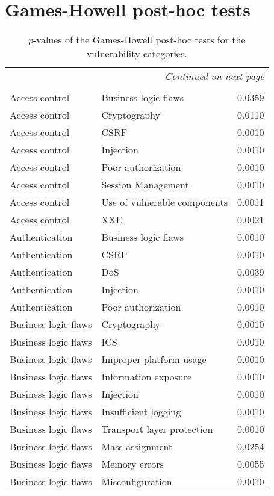 \chapter{Games-Howell post-hoc tests}
\label{app:pairups}

{\footnotesize
\begin{longtable}{lll}
\caption[Games-Howell tests for categories]{$p$-values of the Games-Howell post-hoc tests for the vulnerability categories.}\\
\endfirsthead
\multicolumn{3}{r}{\textit{Continued on next page}} \\
\endfoot
\\
\endlastfoot
Access control & Business logic flaws & 0.0359\\
Access control & Cryptography & 0.0110\\
Access control & CSRF & 0.0010\\
Access control & Injection & 0.0010\\
Access control & Poor authorization & 0.0010\\
Access control & Session Management & 0.0010\\
Access control & Use of vulnerable components & 0.0011\\
Access control & XXE & 0.0021\\
Authentication & Business logic flaws & 0.0010\\
Authentication & CSRF & 0.0010\\
Authentication & DoS & 0.0039\\
Authentication & Injection & 0.0010\\
Authentication & Poor authorization & 0.0010\\
Business logic flaws & Cryptography & 0.0010\\
Business logic flaws & ICS & 0.0010\\
Business logic flaws & Improper platform usage & 0.0010\\
Business logic flaws & Information exposure & 0.0010\\
Business logic flaws & Injection & 0.0010\\
Business logic flaws & Insufficient logging & 0.0010\\
Business logic flaws & Transport layer protection & 0.0010\\
Business logic flaws & Mass assignment & 0.0254\\
Business logic flaws & Memory errors & 0.0055\\
Business logic flaws & Misconfiguration & 0.0010\\

\end{longtable}}
